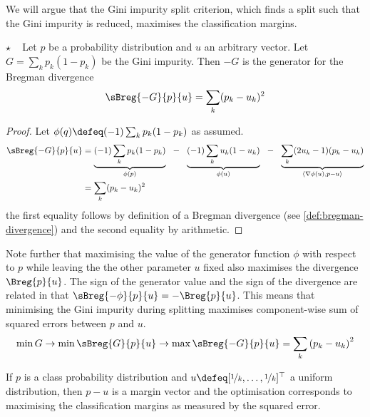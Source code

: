 \documentclass[../main.tex]{subfiles}
\begin{document}
We will argue that the Gini impurity split criterion, which finds a split such that the Gini impurity is reduced, maximises the classification margins.

\begin{proposition} $\star$ ~ Let $p$ be a probability distribution and $u$ an arbitrary vector.
    Let $G =\sum_{k} p_{k}(1-p_{k})$ be the Gini impurity. Then $-G$ is the generator for the Bregman divergence
$$
\sBreg{-G}{p}{u} = \sum_{k}(p_{k}-u_{k})^2
$$
\end{proposition}
\begin{proof}
Let $\phi(q) \defeq (-1) \sum_{k} p_{k}(1-p_{k})$ as assumed.
 \begin{align*}
\sBreg{-G}{p}{u} &=  
\underbrace{(-1) \sum_{k} p_{k}(1-p_{k})}_{\phi(p)} 
 ~ ~ - ~ ~  
\underbrace{(-1) \sum_{k} u_{k}(1-u_{k})}_{\phi(u)}  
~ ~ - ~ ~  
\underbrace{\sum_{k} (2u_{k}-1)(p_{k}-u_{k})}_{\langle \nabla \phi(u), p-u \rangle} \\  
 &= \sum_{k} (p_{k}-u_{k})^2
\end{align*}
the first equality follows by definition of a Bregman divergence (see \ref{def:bregman-divergence}) and the second equality by arithmetic.
\end{proof}


Note further that maximising the value of the generator function $\phi$ with respect to $p$ while leaving the the other parameter $u$ fixed also maximises the divergence $\Breg{p}{u}$. 
The sign of the generator value and the sign of the divergence are related in that  $\sBreg{-\phi}{p}{u} = - \Breg{p}{u}$.
This means that minimising the Gini impurity during splitting maximises component-wise sum of squared errors between $p$ and $u$.
$$
\min G \rightarrow \min \sBreg{G}{p}{u} \rightarrow \max \sBreg{-G}{p}{u} = \sum_{k}\left( p_{k} - u_k \right)^2
$$

If $p$ is a class probability distribution and $u \defeq [\nicefrac{1}{k}, \dots, \nicefrac{1}{k}]^\top$ a uniform distribution, then $p-u$ is a margin vector and the optimisation corresponds to maximising the classification margins as measured by the squared error.
\end{document}
